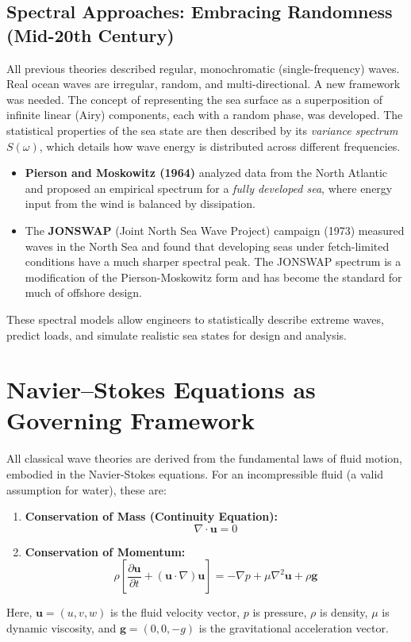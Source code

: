 \documentclass[11pt,letterpaper]{article}
\begin{document}
\subsection{Spectral Approaches: Embracing Randomness (Mid-20th Century)}
All previous theories described regular, monochromatic (single-frequency) waves. Real ocean waves are irregular, random, and multi-directional. A new framework was needed. The concept of representing the sea surface as a superposition of infinite linear (Airy) components, each with a random phase, was developed. The statistical properties of the sea state are then described by its \emph{variance spectrum} $S(\omega)$, which details how wave energy is distributed across different frequencies. 
\begin{itemize}
    \item \textbf{Pierson and Moskowitz (1964)} analyzed data from the North Atlantic and proposed an empirical spectrum for a \emph{fully developed sea}, where energy input from the wind is balanced by dissipation.
    \item The \textbf{JONSWAP} (Joint North Sea Wave Project) campaign (1973) measured waves in the North Sea and found that developing seas under fetch-limited conditions have a much sharper spectral peak. The JONSWAP spectrum is a modification of the Pierson-Moskowitz form and has become the standard for much of offshore design.
\end{itemize}
These spectral models allow engineers to statistically describe extreme waves, predict loads, and simulate realistic sea states for design and analysis.

\section{Navier–Stokes Equations as Governing Framework}
All classical wave theories are derived from the fundamental laws of fluid motion, embodied in the Navier-Stokes equations. For an incompressible fluid (a valid assumption for water), these are:
\begin{enumerate}
    \item \textbf{Conservation of Mass (Continuity Equation):}
        \begin{equation}
        \nabla \cdot \mathbf{u} = 0
        \label{eq:continuity}
        \end{equation}
    \item \textbf{Conservation of Momentum:}
        \begin{equation}
        \rho \left[ \frac{\partial \mathbf{u}}{\partial t} + (\mathbf{u} \cdot \nabla) \mathbf{u} \right] = -\nabla p + \mu \nabla^2 \mathbf{u} + \rho \mathbf{g}
        \label{eq:navierstokes}
        \end{equation}
\end{enumerate}
Here, $\mathbf{u} = (u, v, w)$ is the fluid velocity vector, $p$ is pressure, $\rho$ is density, $\mu$ is dynamic viscosity, and $\mathbf{g} = (0, 0, -g)$ is the gravitational acceleration vector.
\end{document}

